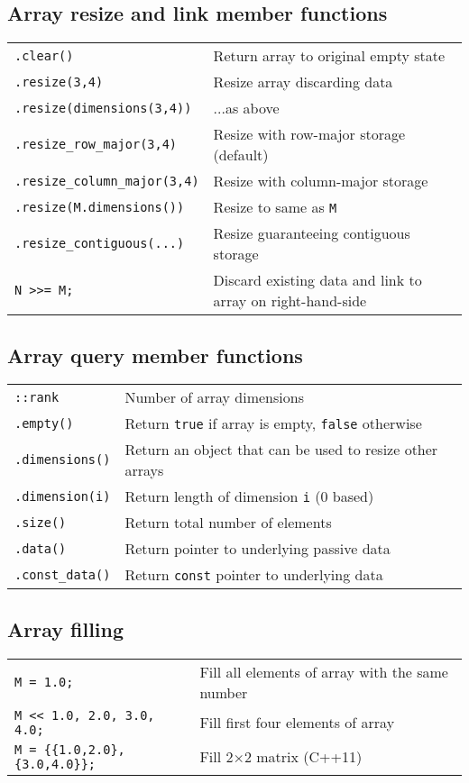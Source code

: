 \documentclass[10pt,a4,landscape]{article}
\def\code#1{\texttt{#1}}
\begin{document}
\subsection*{Array resize and link member functions}
\begin{tabular}{ll}
\code{.clear()} & Return array to original empty state\\
\code{.resize(3,4)} & Resize array discarding data\\
\code{.resize(dimensions(3,4))} & ...as above\\
\code{.resize\_row\_major(3,4)} & Resize with row-major storage (default)\\
\code{.resize\_column\_major(3,4)} & Resize with column-major storage\\
\code{.resize(M.dimensions())} & Resize to same as \code{M}\\
\code{.resize\_contiguous(...)} & Resize guaranteeing contiguous storage\\
\code{N >{}>= M;} & Discard existing data and link to array on right-hand-side\\
\end{tabular}
\subsection*{Array query member functions}
\begin{tabular}{ll}
\code{::rank} & Number of array dimensions\\
\code{.empty()} & Return \code{true} if array is empty, \code{false} otherwise\\
\code{.dimensions()} & Return an object that can be used to resize other arrays\\
\code{.dimension(i)} & Return length of dimension \code{i} (0 based)\\
\code{.size()} & Return total number of elements\\
\code{.data()} & Return pointer to underlying passive data\\
\code{.const\_data()} & Return \code{const} pointer to underlying data\\
\end{tabular}
\subsection*{Array filling}
\begin{tabular}{ll}
\code{M = 1.0;} & Fill all elements of array with the same number\\
\code{M <{}< 1.0, 2.0, 3.0, 4.0;} & Fill first four elements of array\\
\code{M = \{\{1.0,2.0\},\{3.0,4.0\}\};} & Fill 2$\times$2 matrix (C++11)\\
\end{tabular}
\end{document}
